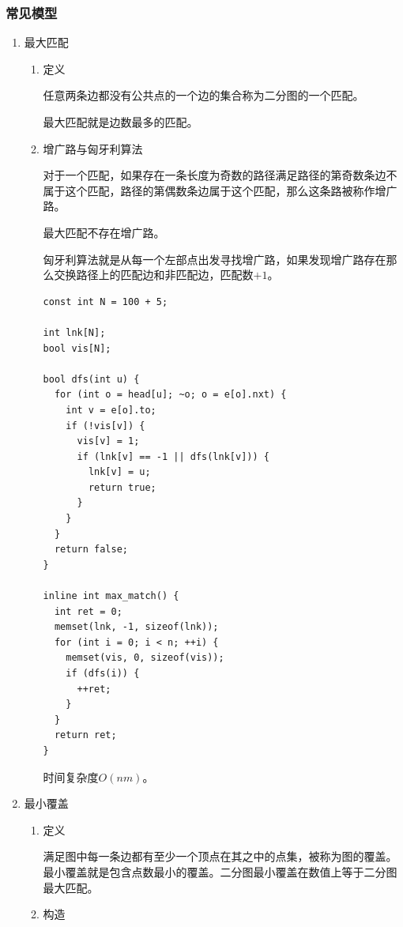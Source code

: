 \documentclass[11pt]{article}
\begin{document}
\subsubsection{常见模型}
\label{sec-2-4-4}
\begin{enumerate}
\item 最大匹配
\label{sec-2-4-4-1}
\begin{enumerate}
\item 定义
\label{sec-2-4-4-1-1}

任意两条边都没有公共点的一个边的集合称为二分图的一个匹配。

最大匹配就是边数最多的匹配。

\item 增广路与匈牙利算法
\label{sec-2-4-4-1-2}

对于一个匹配，如果存在一条长度为奇数的路径满足路径的第奇数条边不属于这个匹配，路径的第偶数条边属于这个匹配，那么这条路被称作增广路。

最大匹配不存在增广路。

匈牙利算法就是从每一个左部点出发寻找增广路，如果发现增广路存在那么交换路径上的匹配边和非匹配边，匹配数\(+1\)。

\begin{verbatim}
const int N = 100 + 5;

int lnk[N];
bool vis[N];

bool dfs(int u) {
  for (int o = head[u]; ~o; o = e[o].nxt) {
    int v = e[o].to;
    if (!vis[v]) {
      vis[v] = 1;
      if (lnk[v] == -1 || dfs(lnk[v])) {
        lnk[v] = u;
        return true;
      }
    }
  }
  return false;
}

inline int max_match() {
  int ret = 0;
  memset(lnk, -1, sizeof(lnk));
  for (int i = 0; i < n; ++i) {
    memset(vis, 0, sizeof(vis));
    if (dfs(i)) {
      ++ret;
    }
  }
  return ret;
}
\end{verbatim}

时间复杂度\(O(nm)\)。
\end{enumerate}

\item 最小覆盖
\label{sec-2-4-4-2}
\begin{enumerate}
\item 定义
\label{sec-2-4-4-2-1}

满足图中每一条边都有至少一个顶点在其之中的点集，被称为图的覆盖。最小覆盖就是包含点数最小的覆盖。二分图最小覆盖在数值上等于二分图最大匹配。

\item 构造
\label{sec-2-4-4-2-2}


\end{enumerate}
\end{enumerate}
\end{document}

